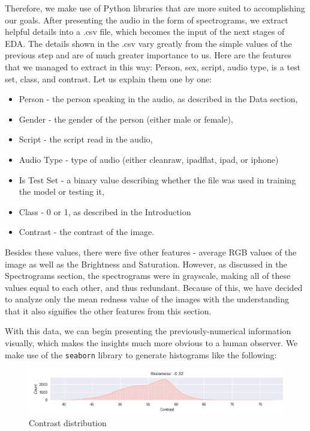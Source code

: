 \documentclass[11pt, letterpaper]{article}
\begin{document}
Therefore, we make use of Python libraries that are more suited to accomplishing our goals. After presenting the audio in the form of spectrograms, we extract helpful details into a .csv file, which becomes the input of the next stages of EDA. The details shown in the .csv vary greatly from the simple values of the previous step and are of much greater importance to us. Here are the features that we managed to extract in this way: Person, sex, script, audio type, is a test set, class, and contrast. Let us explain them one by one:
\begin{itemize}
    \item Person - the person speaking in the audio, as described in the Data section,
    \item Gender - the gender of the person (either male or female),
    \item Script - the script read in the audio,
    \item Audio Type - type of audio (either cleanraw, ipadflat, ipad, or iphone)
    \item Is Test Set - a binary value describing whether the file was used in training the model or testing it,
    \item Class - 0 or 1, as described in the Introduction
    \item Contrast - the contrast of the image.
\end{itemize}
Besides these values, there were five other features - average RGB values of the image as well as the Brightness and Saturation. However, as discussed in the Spectrograms section, the spectrograms were in grayscale, making all of these values equal to each other, and thus redundant. Because of this, we have decided to analyze only the mean redness value of the images with the understanding that it also signifies the other features from this section.

With this data, we can begin presenting the previously-numerical information visually, which makes the insights much more obvious to a human observer. We make use of the \verb|seaborn| library to generate histograms like the following:

\begin{figure}[H]
    \centering
    \includegraphics[width=1\linewidth]{image.png}
    \caption{Contrast distribution}
    \label{fig:enter-label}
\end{figure}
\end{document}
